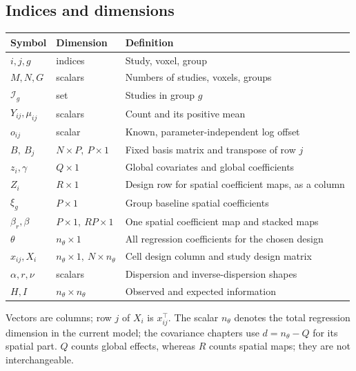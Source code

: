 \documentclass[11pt,a4paper]{article}
\numberwithin{equation}{section}
\begin{document}
\subsection{Indices and dimensions}
\begin{center}
\begin{tabularx}{\textwidth}{l l T}
\toprule
Symbol & Dimension & Definition\\
\midrule
$i,j,g$ & indices & Study, voxel, group\\
$M,N,G$ & scalars & Numbers of studies, voxels, groups\\
$\mathcal I_g$ & set & Studies in group $g$\\
$Y_{ij},\mu_{ij}$ & scalars & Count and its positive mean\\
$o_{ij}$ & scalar & Known, parameter-independent log offset\\
$B,\ B_j$ & $N\times P,\ P\times1$ & Fixed basis matrix and transpose of row $j$\\
$z_i,\gamma$ & $Q\times1$ & Global covariates and global coefficients\\
$Z_i$ & $R\times1$ & Design row for spatial coefficient maps, as a column\\
$\xi_g$ & $P\times1$ & Group baseline spatial coefficients\\
$\beta_r,\beta$ & $P\times1,\ RP\times1$ & One spatial coefficient map and stacked maps\\
$\theta$ & $n_\theta\times1$ & All regression coefficients for the chosen design\\
$x_{ij},X_i$ & $n_\theta\times1,\ N\times n_\theta$ & Cell design column and study design matrix\\
$\alpha,r,\nu$ & scalars & Dispersion and inverse-dispersion shapes\\
$H,I$ & $n_\theta\times n_\theta$ & Observed and expected information\\
\bottomrule
\end{tabularx}
\end{center}
Vectors are columns; row $j$ of $X_i$ is $x_{ij}^{\top}$.
The scalar $n_\theta$ denotes the total regression dimension in the
current model; the covariance chapters use $d=n_\theta-Q$ for its
spatial part. $Q$ counts global effects, whereas $R$ counts spatial
maps; they are not interchangeable.
\end{document}
